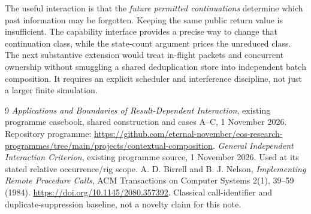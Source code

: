 \documentclass[11pt]{article}
\begin{document}
The useful interaction is that the \emph{future permitted continuations} determine which past information may be forgotten. Keeping the same public return value is insufficient. The capability interface provides a precise way to change that continuation class, while the state-count argument prices the unreduced class. The next substantive extension would treat in-flight packets and concurrent ownership without smuggling a shared deduplication store into independent batch composition. It requires an explicit scheduler and interference discipline, not just a larger finite simulation.

\begin{thebibliography}{9}
 \emph{Applications and Boundaries of Result-Dependent Interaction}, existing programme casebook, shared construction and cases A--C, 1 November 2026. Repository programme: \url{https://github.com/eternal-november/eos-research-programmes/tree/main/projects/contextual-composition}.
 \emph{General Independent Interaction Criterion}, existing programme source, 1 November 2026. Used at its stated relative occurrence/rig scope.
 A. D. Birrell and B. J. Nelson, \emph{Implementing Remote Procedure Calls}, ACM Transactions on Computer Systems 2(1), 39--59 (1984). \url{https://doi.org/10.1145/2080.357392}. Classical call-identifier and duplicate-suppression baseline, not a novelty claim for this note.
\end{thebibliography}
\end{document}
